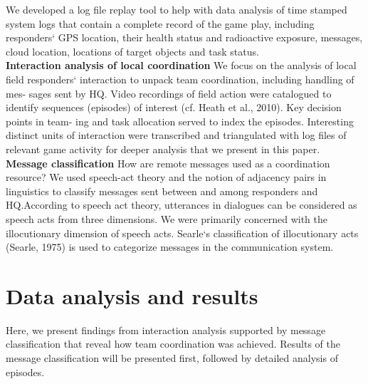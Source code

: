 We developed a log file replay tool to help with data analysis of time stamped system logs that contain a complete record of the game play, including responders` GPS location, their health status and radioactive exposure, messages, cloud location, locations of target objects and task status.\\

\textbf{Interaction analysis of local coordination} We focus on the analysis of local field responders` interaction to unpack team coordination, including handling of mes- sages sent by HQ. Video recordings of field action were catalogued to identify sequences (episodes) of interest (cf. Heath et al., 2010). Key decision points in team- ing and task allocation served to index the episodes. Interesting distinct units of interaction were transcribed and triangulated with log files of relevant game activity for deeper analysis that we present in this paper.\\

\textbf{Message classification} How are remote messages used as a coordination resource? We used speech-act theory and the notion of adjacency pairs in linguistics to classify messages sent between and among responders and HQ.According to speech act theory, utterances in dialogues can be considered as speech acts from three dimensions. We were primarily concerned with the illocutionary dimension of speech acts. Searle`s classification of illocutionary acts (Searle, 1975) is used to categorize messages in the communication system.\\


\section{Data analysis and results}
Here, we present findings from interaction analysis supported by message classification that reveal how team coordination was achieved. Results of the message classification will be presented first, followed by detailed analysis of episodes. 


